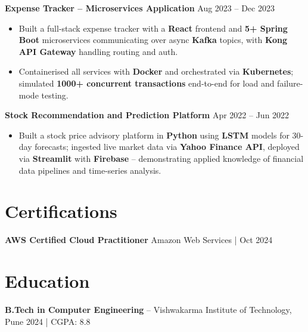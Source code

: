 \documentclass[letterpaper,10pt]{article}
\begin{document}
\textbf{Expense Tracker -- Microservices Application} \hfill Aug 2023 -- Dec 2023
\begin{itemize}[leftmargin=*]
    \item Built a full-stack expense tracker with a \textbf{React} frontend and \textbf{5+ Spring Boot} microservices communicating over async \textbf{Kafka} topics, with \textbf{Kong API Gateway} handling routing and auth.
    \item Containerised all services with \textbf{Docker} and orchestrated via \textbf{Kubernetes}; simulated \textbf{1000+ concurrent transactions} end-to-end for load and failure-mode testing.
\end{itemize}

\textbf{Stock Recommendation and Prediction Platform} \hfill Apr 2022 -- Jun 2022
\begin{itemize}[leftmargin=*]
    \item Built a stock price advisory platform in \textbf{Python} using \textbf{LSTM} models for 30-day forecasts; ingested live market data via \textbf{Yahoo Finance API}, deployed via \textbf{Streamlit} with \textbf{Firebase} -- demonstrating applied knowledge of financial data pipelines and time-series analysis.
\end{itemize}

\section*{Certifications}
\textbf{AWS Certified Cloud Practitioner} \hfill Amazon Web Services \;|\; Oct 2024

\section*{Education}
\textbf{B.Tech in Computer Engineering} -- Vishwakarma Institute of Technology, Pune \hfill 2024 \;|\; CGPA: 8.8
\end{document}
